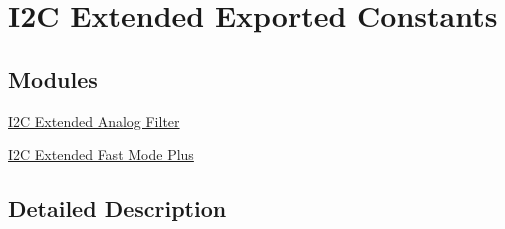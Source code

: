 \hypertarget{group___i2_c_ex___exported___constants}{}\section{I2C Extended Exported Constants}
\label{group___i2_c_ex___exported___constants}
\subsection*{Modules}
\begin{DoxyCompactItemize}
\item 
\hyperlink{group___i2_c_ex___analog___filter}{I2\+C Extended Analog Filter}
\item 
\hyperlink{group___i2_c_ex___fast_mode_plus}{I2\+C Extended Fast Mode Plus}
\end{DoxyCompactItemize}


\subsection{Detailed Description}
